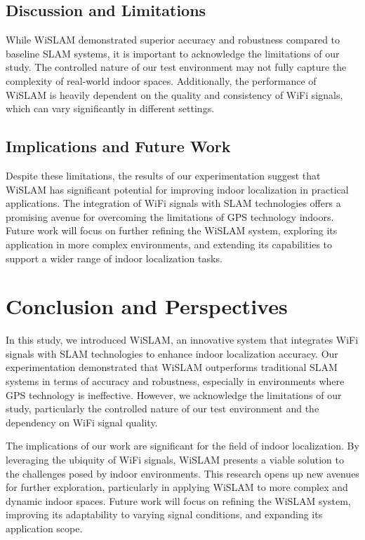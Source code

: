 \documentclass[
	a4paper, %
	11pt, %
	unnumberedsections, %
	twoside, %
]{LTJournalArticle}
\begin{document}
\subsection{Discussion and Limitations}
While WiSLAM demonstrated superior accuracy and robustness compared to baseline SLAM systems, it is important to acknowledge the limitations of our study. The controlled nature of our test environment may not fully capture the complexity of real-world indoor spaces. Additionally, the performance of WiSLAM is heavily dependent on the quality and consistency of WiFi signals, which can vary significantly in different settings.

\subsection{Implications and Future Work}
Despite these limitations, the results of our experimentation suggest that WiSLAM has significant potential for improving indoor localization in practical applications. The integration of WiFi signals with SLAM technologies offers a promising avenue for overcoming the limitations of GPS technology indoors. Future work will focus on further refining the WiSLAM system, exploring its application in more complex environments, and extending its capabilities to support a wider range of indoor localization tasks.


\section{Conclusion and Perspectives}
In this study, we introduced WiSLAM, an innovative system that integrates WiFi signals with SLAM technologies to enhance indoor localization accuracy. Our experimentation demonstrated that WiSLAM outperforms traditional SLAM systems in terms of accuracy and robustness, especially in environments where GPS technology is ineffective. However, we acknowledge the limitations of our study, particularly the controlled nature of our test environment and the dependency on WiFi signal quality.

The implications of our work are significant for the field of indoor localization. By leveraging the ubiquity of WiFi signals, WiSLAM presents a viable solution to the challenges posed by indoor environments. This research opens up new avenues for further exploration, particularly in applying WiSLAM to more complex and dynamic indoor spaces. Future work will focus on refining the WiSLAM system, improving its adaptability to varying signal conditions, and expanding its application scope.
\end{document}
